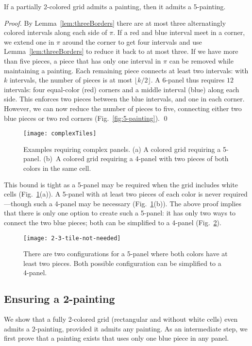 \documentclass[runningheads]{llncs}
\begin{document}
\begin{theorem}
\label{the:5painting}
If a partially 2-colored grid admits a painting, then it admits a 5-painting.
\end{theorem}

\begin{proof}
By Lemma~\ref{lem:threeBorders} there are at most three alternatingly colored intervals along each side of $\pi$.
If a red and blue interval meet in a corner, we extend one in $\pi$ around the corner to get four intervals and use Lemma~\ref{lem:threeBorders} to reduce it back to at most three.
If we have more than five pieces, a piece that has only one interval in $\pi$ can be removed while maintaining a painting.
Each remaining piece connects at least two intervals: with $k$ intervals, the number of pieces is at most $\lfloor k/2 \rfloor$.
A $6$-panel thus requires $12$ intervals: four equal-color (red) corners and a middle interval (blue) along each side.
This enforces two pieces between the blue intervals, and one in each corner.
However, we can now reduce the number of pieces to five, connecting either two blue pieces or two red corners (Fig.~\ref{fig:5-painting}).
\hfill\qed
\end{proof}

\begin{figure}[t]
\centering
\texttt{[image: complexTiles]}
\caption{Examples requiring complex panels. (a) A colored grid requiring a 5-panel. (b)~A colored grid requiring a 4-panel with two pieces of both colors in the same cell.}
\label{fig:complexPanels}
\end{figure}

This bound is tight as a 5-panel may be required when the grid includes white cells (Fig.~\ref{fig:complexPanels}(a)).
A 5-panel with at least two pieces of each color is never required---though such a 4-panel may be necessary (Fig.~\ref{fig:complexPanels}(b)).
The above proof implies that there is only one option to create such a 5-panel:
it has only two ways to connect the two blue pieces; both can be simplified to a 4-panel (Fig.~\ref{fig:2-3-panel-not-needed}).

\begin{figure}[t]
\centering
\texttt{[image: 2-3-tile-not-needed]}
\caption{There are two configurations for a 5-panel where both colors have at least two pieces. Both possible configuration can be simplified to a 4-panel.}
\label{fig:2-3-panel-not-needed}
\end{figure}

\subsection{Ensuring a 2-painting}
\label{ssec:simple}
We show that a fully 2-colored grid (rectangular and without white cells) even admits a $2$-painting, provided it admits any painting.
As an intermediate step, we first prove that a painting exists that uses only one blue piece in any panel.
\end{document}
